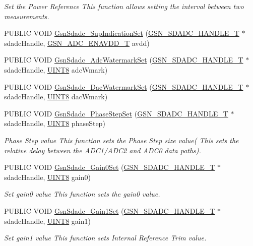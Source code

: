\begin{DoxyCompactItemize}
\begin{DoxyCompactList}\small\item\em Set the Power Reference This function allows setting the interval between two measurements. \end{DoxyCompactList}\item 
PUBLIC VOID \hyperlink{a00652_gada9c57e9f9c7164476d7cb260d325259}{GsnSdadc\_\-SupIndicationSet} (\hyperlink{a00214}{GSN\_\-SDADC\_\-HANDLE\_\-T} $\ast$sdadcHandle, \hyperlink{a00652_ga46353c29cf1b862e0ab85b39b68176af}{GSN\_\-ADC\_\-ENAVDD\_\-T} avdd)
\item 
PUBLIC VOID \hyperlink{a00652_ga43a9f1be86f0b69b6f38e19ceb84dc7c}{GsnSdadc\_\-AdcWatermarkSet} (\hyperlink{a00214}{GSN\_\-SDADC\_\-HANDLE\_\-T} $\ast$sdadcHandle, \hyperlink{a00660_gab27e9918b538ce9d8ca692479b375b6a}{UINT8} adcWmark)
\item 
PUBLIC VOID \hyperlink{a00652_ga7723677c0f07b7d297b0ddba92e85ee2}{GsnSdadc\_\-DacWatermarkSet} (\hyperlink{a00214}{GSN\_\-SDADC\_\-HANDLE\_\-T} $\ast$sdadcHandle, \hyperlink{a00660_gab27e9918b538ce9d8ca692479b375b6a}{UINT8} dacWmark)
\item 
PUBLIC VOID \hyperlink{a00652_ga434361cdbd39e44f4362966bc823b65a}{GsnSdadc\_\-PhaseStepSet} (\hyperlink{a00214}{GSN\_\-SDADC\_\-HANDLE\_\-T} $\ast$sdadcHandle, \hyperlink{a00660_gab27e9918b538ce9d8ca692479b375b6a}{UINT8} phaseStep)
\begin{DoxyCompactList}\small\item\em Phase Step value This function sets the Phase Step size value( This sets the relative delay between the ADC1/ADC2 and ADC0 data paths). \end{DoxyCompactList}\item 
PUBLIC VOID \hyperlink{a00652_ga25758a48ce1abef0087952488e11781a}{GsnSdadc\_\-Gain0Set} (\hyperlink{a00214}{GSN\_\-SDADC\_\-HANDLE\_\-T} $\ast$sdadcHandle, \hyperlink{a00660_gab27e9918b538ce9d8ca692479b375b6a}{UINT8} gain0)
\begin{DoxyCompactList}\small\item\em Set gain0 value This function sets the gain0 value. \end{DoxyCompactList}\item 
PUBLIC VOID \hyperlink{a00652_gab98098375ff3ee8b69731a3571788729}{GsnSdadc\_\-Gain1Set} (\hyperlink{a00214}{GSN\_\-SDADC\_\-HANDLE\_\-T} $\ast$sdadcHandle, \hyperlink{a00660_gab27e9918b538ce9d8ca692479b375b6a}{UINT8} gain1)
\begin{DoxyCompactList}\small\item\em Set gain1 value This function sets Internal Reference Trim value. \end{DoxyCompactList}\item 

\end{DoxyCompactItemize}

